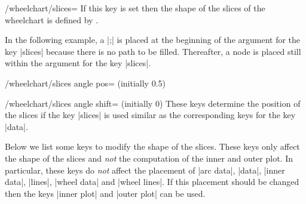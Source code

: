 \documentclass[a4paper,english,dvipsnames]{ltxdoc}
\begin{document}
\begin{key}{/wheelchart/slices=}
If this key is set then the shape of the slices of the wheelchart is defined by .
\begin{codeexample}[width=10cm]
\begin{tikzpicture}
\wheelchart[
    radius={2.7}{3.1},
    slices={(0,-0.3)--(0.3,0)--(0,0.3)
        --cycle;},
    value=1
]{\exampleforthismanual}
\wheelchart[
    data=,
    value=1
]{\exampleforthismanual}
\wheelchart[
    data=,
    radius={2}{2},
    slices={(0,0) circle[radius=0.4];},
    slices style=White,
    value=1
]{\exampleforthismanual}
\wheelchart[
    data=,
    radius={2}{2},
    slices={(0,0) circle[radius=0.3];},
    value=1,
    wheel data=\WCcount
]{\exampleforthismanual}
\end{tikzpicture}
\end{codeexample}
In the following example, a |;| is placed at the beginning of the argument for the key |slices| because there is no path to be filled. Thereafter, a node is placed still within the argument for the key |slices|.
\begin{codeexample}[width=10cm]
\end{codeexample}
\end{key}
\begin{key}{/wheelchart/slices angle pos= (initially 0.5)}
\end{key}
\begin{key}{/wheelchart/slices angle shift= (initially 0)}
These keys determine the position of the slices if the key |slices| is used similar as the corresponding keys for the key |data|.
\end{key}
Below we list some keys to modify the shape of the slices. These keys only affect the shape of the slices and \emph{not} the computation of the inner and outer plot. In particular, these keys do \emph{not} affect the placement of |arc data|, |data|, |inner data|, |lines|, |wheel data| and |wheel lines|. If this placement should be changed then the keys |inner plot| and |outer plot| can be used.
\end{document}
